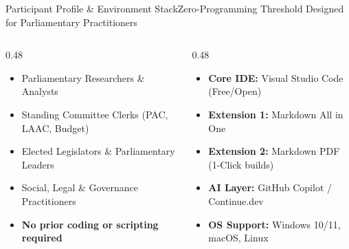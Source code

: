 \documentclass[aspectratio=169, 10pt]{beamer}
\begin{document}
\begin{frame}{Participant Profile \& Environment Stack}{Zero-Programming Threshold Designed for Parliamentary Practitioners}
  \begin{columns}[c]
    \begin{column}{0.48\textwidth}
      \begin{tcolorbox}[colback=lightgrey, colframe=tanzaniablue, arc=1.5mm, boxrule=0.8pt, title=\textbf{Target Trainee Cohort}]
        \small
        \begin{itemize}
          \item Parliamentary Researchers \& Analysts
          \item Standing Committee Clerks (PAC, LAAC, Budget)
          \item Elected Legislators \& Parliamentary Leaders
          \item Social, Legal \& Governance Practitioners
          \item \textcolor{suagreen}{\textbf{No prior coding or scripting required}}
        \end{itemize}
      \end{tcolorbox}
    \end{column}
    \begin{column}{0.48\textwidth}
      \begin{tcolorbox}[colback=lightgrey, colframe=suagreen, arc=1.5mm, boxrule=0.8pt, title=\textbf{Approved Technology Stack}]
        \small
        \begin{itemize}
          \item \textbf{\textcolor{tanzaniablue}{Core IDE:}} Visual Studio Code (Free/Open)
          \item \textbf{\textcolor{suagreen}{Extension 1:}} Markdown All in One
          \item \textbf{\textcolor{suagreen}{Extension 2:}} Markdown PDF (1-Click builds)
          \item \textbf{\textcolor{tanzaniablue}{AI Layer:}} GitHub Copilot / Continue.dev
          \item \textbf{\textcolor{darkcharcoal}{OS Support:}} Windows 10/11, macOS, Linux
        \end{itemize}
      \end{tcolorbox}
    \end{column}
  \end{columns}
\end{frame}
\end{document}
